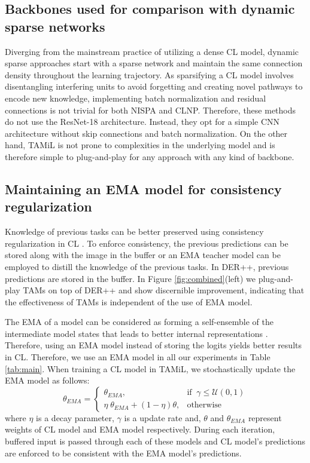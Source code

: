 \documentclass{article} %
\begin{document}
 \subsection{Backbones used for comparison with dynamic sparse networks}\label{backbones}
Diverging from the mainstream practice of utilizing a dense CL model, dynamic sparse approaches 
start with a sparse network and maintain the same connection density throughout the learning trajectory. As sparsifying a CL model involves disentangling interfering units to avoid forgetting and
creating novel pathways to encode new knowledge, implementing batch normalization and residual connections is not trivial for both NISPA and CLNP. Therefore, these methods do not use the ResNet-18 architecture. Instead, they opt for a simple CNN architecture without skip connections and batch normalization. On the other hand, TAMiL is not prone to complexities in the underlying model and is therefore simple to plug-and-play for any approach with any kind of backbone.  


\subsection{Maintaining an EMA model for consistency regularization}
Knowledge of previous tasks can be better preserved using consistency regularization in CL \citep{bhat2022consistency}. To enforce consistency, the previous predictions can be stored along with the image in the buffer or an EMA teacher model can be employed to distill the knowledge of the previous tasks. In DER++, previous predictions are stored in the buffer. In Figure \ref{fig:combined}(left) we plug-and-play TAMs on top of DER++ and show discernible improvement, indicating that the effectiveness of TAMs is independent of the use of EMA model. 

 The EMA of a model can be considered as forming a self-ensemble of the intermediate model states that leads to better internal representations \citep{arani2022learning}. Therefore, using an EMA model instead of storing the logits yields better results in CL. Therefore, we use an EMA model in all our experiments in Table \ref{tab:main}. When training a CL model in TAMiL, we stochastically update the EMA model as follows: 
\begin{equation}
    \label{eqn:ema}
\theta_{EMA}= 
\begin{cases}
    \theta_{EMA},& \text{if  } \: \gamma \leq \mathcal{U}(0, 1)\\
    \eta \; \theta_{EMA} +\left(1-\eta \right) \theta,              & \text{otherwise}
\end{cases}
\end{equation}
 where $\eta$ is a decay parameter, $\gamma$ is a update rate and, $\theta$ and  $\theta_{EMA}$ represent weights of CL model and EMA model respectively. During each iteration, buffered input is passed through each of these models and CL model's predictions are enforced to be consistent with the EMA model's predictions.  
\end{document}
